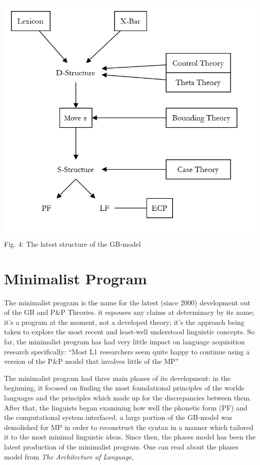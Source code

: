 \documentclass[a4paper,10pt]{article}
\begin{document}
\begin{center}
	\includegraphics[scale=0.25]{gb-model-end.png}
	\linebreak
	Fig. 4: The latest structure of the GB-model \citep[p.~181]{ChUGAI}
\end{center}


\section{Minimalist Program}
The minimalist program is the name for the latest (since 2000) development out of the GB and P\&P
Theories. it espouses any claims at determinacy by its name; it's a program at the moment, not a
developed theory; it's the approach being taken to explore the most recent and least-well understood
linguistic concepts. \citep[p.~242]{ChUGAI}
So far, the minimalist program has had very little impact on language acquisition research specifically:
``Most L1 researchers seem quite happy to continue using a version of the P\&P model that involves
little of the MP'' \citep[p.~219]{ChUGAI}

The minimalist program had three main phases of its development: in the beginning, it focused on
finding the most foundational principles of the worlds languages and the principles which made up
for the discrepancies between them. After that, the linguists began examining how well the phonetic
form (PF) and the computational system interfaced. a large portion of the GB-model was demolished
for MP in order to reconstruct the syntax in a manner which tailored it to the most minimal
linguistic ideas. \citep[p.~3]{ChUGAI}
Since then, the phases model has been the latest production of the minimalist program. One can
read about the phases model from \emph{The Architecture of Language}, \citet{Carr05}
\end{document}
